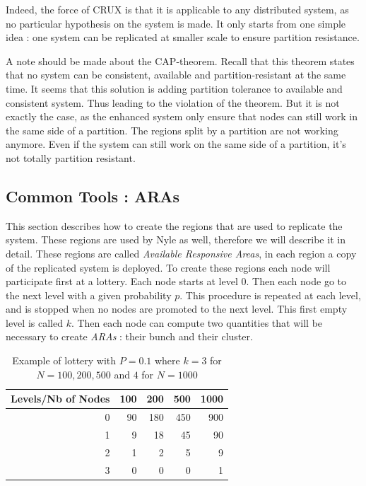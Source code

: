 \documentclass[a4paper,11pt,oneside]{report}
\begin{document}
Indeed, the force of CRUX \cite{Basescu2014} is that it is applicable to any
distributed system, as no particular hypothesis on the system is made. It only
starts from one simple idea : one system can be replicated at smaller scale to
ensure partition resistance. 

A note should be made about the CAP-theorem. Recall that this theorem states
that no system can be consistent, available and partition-resistant at the same
time. It seems that this solution is adding partition tolerance to available
and consistent system. Thus leading to the violation of the theorem. But it is
not exactly the case, as the enhanced system only ensure that nodes can still
work in the same side of a partition. The regions split by a partition are not
working anymore. Even if the system can still work on the same side of a
partition, it's not totally partition resistant.

\subsection{Common Tools :  ARAs} This section describes how to create the
regions that are used to replicate the system. These regions are used by Nyle
as well, therefore we will describe it in detail. These regions are called
\textit{Available Responsive Areas}, in each region a copy of the replicated
system is deployed. To create these regions each node will participate first at
a lottery. Each node starts at level 0. Then each node go to the next level
with a given probability $p$. This
procedure is repeated at each level, and is stopped when no nodes are promoted
to the next level. This first empty level is called $k$. Then each node can
compute two quantities that will be necessary to create \textit{ARAs} : their
bunch and their cluster. 

\begin{table}[] 
\centering
\begin{tabular}{rrrrr}
Levels/Nb of Nodes & 100 & 200 & 500 & 1000 \\ \hline
\multicolumn{1}{r|}{0} & 90  & 180 & 450 & 900  \\
\multicolumn{1}{r|}{1} & 9 & 18  & 45  & 90   \\
\multicolumn{1}{r|}{2} & 1   & 2   & 5   & 9 \\
\multicolumn{1}{r|}{3} & 0   & 0   & 0   & 1  
\end{tabular}
\caption{Example of lottery with $P = 0.1$ where $k= 3$ for $N= 100,200,500$
    and $4$ for $N = 1000$}
 \end{table}
\end{document}
